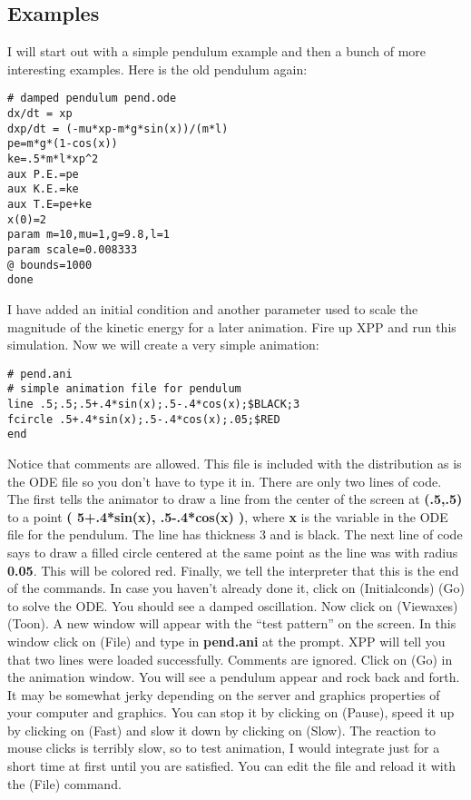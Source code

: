 \documentclass{article}
\begin{document}
\subsection{Examples} 
I will start out with a simple pendulum example and then a bunch of
more interesting examples.
Here is the old pendulum again:
\begin{verbatim}
# damped pendulum pend.ode
dx/dt = xp
dxp/dt = (-mu*xp-m*g*sin(x))/(m*l)
pe=m*g*(1-cos(x))
ke=.5*m*l*xp^2
aux P.E.=pe
aux K.E.=ke
aux T.E=pe+ke
x(0)=2
param m=10,mu=1,g=9.8,l=1
param scale=0.008333
@ bounds=1000
done
\end{verbatim} 
I have added an initial condition and another parameter used to scale
the magnitude of the kinetic energy for a later animation. Fire up XPP
and run this simulation. Now we will create a very simple animation:
\begin{verbatim}
# pend.ani
# simple animation file for pendulum
line .5;.5;.5+.4*sin(x);.5-.4*cos(x);$BLACK;3
fcircle .5+.4*sin(x);.5-.4*cos(x);.05;$RED
end
\end{verbatim}
Notice that comments are allowed. This file is included with the
distribution as is the ODE file so you don't have to type it in. There
are only two lines of code. The first tells the animator to draw a
line from the center of the screen at {\bf (.5,.5)} to a point {\bf
( 5+.4*sin(x), .5-.4*cos(x) )}, where {\bf x} is the variable in the
ODE file for the pendulum. The line has thickness 3 and is black. The
next line of code says to draw a filled circle centered at the same
point as the line was with radius {\bf 0.05}.  This will be colored
red.  Finally, we tell the interpreter that this is the end of the
commands.
In case you haven't already done it, click on (Initialconds)
(Go) to solve the ODE. You should see a damped oscillation. Now click
on (Viewaxes) (Toon). A new window will appear with the ``test
pattern'' on the screen. In this window click on (File) and type in
{\bf pend.ani} at the prompt. XPP will tell you that two lines were
loaded successfully. Comments are ignored. Click on (Go) in the
animation window. You will see a pendulum appear and rock back and
forth. It may be somewhat jerky depending on the server and graphics
properties of your computer and graphics. You can stop it by clicking
on (Pause), speed it up by clicking on (Fast) and slow it down by
clicking on (Slow).  The reaction to mouse clicks is terribly slow, so
to test animation, I would integrate just for a short time at first
until you are satisfied. You can edit the file and reload it with the
(File) command.  
\end{document}
